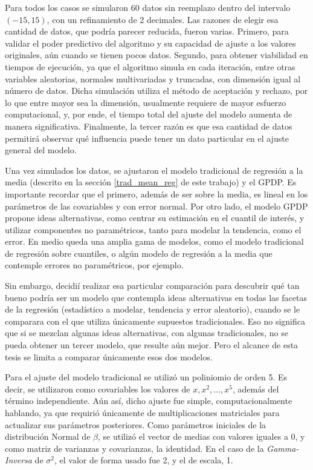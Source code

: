Para todos los casos se simularon 60 datos sin reemplazo dentro del intervalo $(-15,15)$, con un refinamiento de 2 decimales. Las razones de elegir esa cantidad de datos, que podr\'ia parecer reducida, fueron varias. Primero, para validar el poder predictivo del algoritmo y su capacidad de ajuste a los valores originales, aún cuando se tienen pocos datos. Segundo, para obtener viabilidad en tiempos de ejecuci\'on, ya que el algoritmo simula en cada iteraci\'on, entre otras variables aleatorias, normales multivariadas y truncadas, con dimensi\'on igual al n\'umero de datos. Dicha simulaci\'on utiliza el m\'etodo de aceptaci\'on y rechazo, por lo que entre mayor sea la dimensi\'on, usualmente requiere de mayor esfuerzo computacional, y, por ende, el tiempo total del ajuste del modelo aumenta de manera significativa. Finalmente, la tercer raz\'on es que esa cantidad de datos permitir\'a observar qu\'e influencia puede tener un dato particular en el ajuste general del modelo.

Una vez simulados los datos, se ajustaron el modelo tradicional de regresi\'on a la media (descrito en la secci\'on \ref{trad_mean_reg} de este trabajo) y el GPDP. Es importante recordar que el primero, adem\'as de ser sobre la media, es lineal en los  par\'ametros de las covariables y con error normal. Por otro lado, el modelo GPDP propone ideas alternativas, como centrar su estimaci\'on en el cuantil de inter\'es, y utilizar componentes no param\'etricos, tanto para modelar la tendencia, como el error. En medio queda una amplia gama de modelos, como el modelo tradicional de regresi\'on sobre cuantiles, o alg\'un modelo de regresi\'on a la media que contemple errores no param\'etricos, por ejemplo. 

Sin embargo, decidi\'i realizar esa particular comparaci\'on para descubrir qu\'e tan bueno podr\'ia ser un modelo que contempla ideas alternativas en todas las facetas de la regresi\'on (estad\'istico a modelar, tendencia y error aleatorio), cuando se le comparara con el que utiliza \'unicamente supuestos tradicionales. Eso no significa que si se mezclan algunas ideas alternativas, con algunas tradicionales, no se pueda obtener un tercer modelo, que resulte a\'un mejor. Pero el alcance de esta tesis se limita a comparar \'unicamente esos dos modelos.

Para el ajuste del modelo tradicional se utiliz\'o un poliniomio de orden 5. Es decir, se utilizaron como covariables los valores de $x, x^2, \ldots, x^5$, adem\'as del t\'ermino independiente. A\'un as\'i, dicho ajuste fue simple, computacionalmente hablando, ya que requiri\'o \'unicamente de multiplicaciones matriciales para actualizar sus par\'ametros posteriores. Como par\'ametros iniciales de la distribuci\'on Normal de $\beta$, se utiliz\'o el vector de medias con valores iguales a 0, y como matriz de varianzas y covarianzas, la identidad. En el caso de la \textit{Gamma-Inversa} de $\sigma^2$, el valor de forma usado fue 2, y el de escala, 1.

